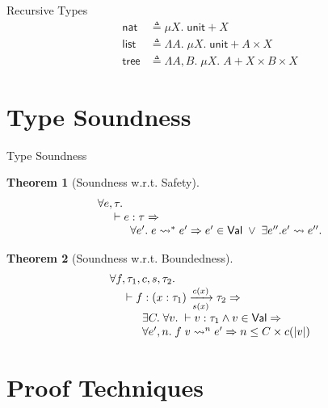 \documentclass{beamer}
\newtheorem{thm}{Theorem}
\newcommand{\arrow}[4]{#1\xrightarrow[#3]{#2}#4}
\newcommand{\symunit}{\mathsf{unit}}
\newcommand{\symlist}{\mathsf{list}}
\newcommand{\defeq}{\triangleq}
\begin{document}
\begin{frame}{Recursive Types}
\begin{align*}
\mathsf{nat} &\defeq \mu X.\; \symunit + X \\
\symlist &\defeq \Lambda A.\; \mu X.\; \symunit + A \times X \\
\mathsf{tree} &\defeq \Lambda A,B.\; \mu X.\; A + X \times B \times X
\end{align*}

\end{frame}

\section{Type Soundness}

\begin{frame}{Type Soundness}

\begin{thm}[Soundness w.r.t. Safety]
$$
\begin{array}{l}
\forall e,\tau. \\
\hspace{0.2in} \vdash e:\tau \Rightarrow \\
\hspace{0.4in} \forall e'.\; e \leadsto^* e' \Rightarrow e'\in\mathsf{Val} \;\vee\; \exists e''. e' \leadsto e''.
\end{array}
$$
\end{thm}

\begin{thm}[Soundness w.r.t. Boundedness]
$$
\begin{array}{l}
\forall f,\tau_1,c,s,\tau_2. \\
\hspace{0.2in} \vdash f:\arrow{(x:\tau_1)}{c(x)}{s(x)}{\tau_2} \Rightarrow \\
\hspace{0.4in} \exists C. \;\forall v.\; \vdash v:\tau_1 \wedge v\in\mathsf{Val} \Rightarrow \\
\hspace{0.4in} \forall e',n.\; f\;v\leadsto^n e' \Rightarrow n\leq C\times c(|v|)
\end{array}
$$
\end{thm}

\end{frame}

\section{Proof Techniques}
\end{document}
